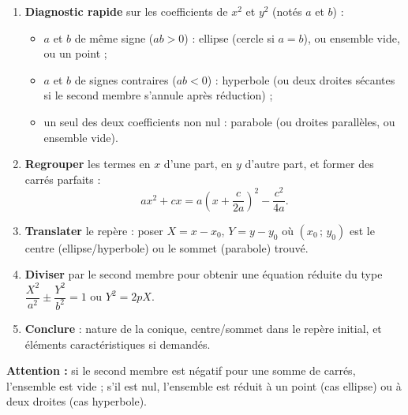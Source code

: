 \documentclass[11pt]{article}
\newcommand{\cle}[1]{{\popxbold\color{popdark}#1}}
\begin{document}
\begin{methode}
\begin{enumerate}
\item \textbf{Diagnostic rapide} sur les coefficients de $x^2$ et $y^2$ (notés $a$ et $b$) :
\begin{itemize}
\item $a$ et $b$ de même signe ($ab > 0$) : ellipse (cercle si $a = b$), ou ensemble vide, ou un point ;
\item $a$ et $b$ de signes contraires ($ab < 0$) : hyperbole (ou deux droites sécantes si le second membre s'annule après réduction) ;
\item un seul des deux coefficients non nul : parabole (ou droites parallèles, ou ensemble vide).
\end{itemize}
\item \textbf{Regrouper} les termes en $x$ d'une part, en $y$ d'autre part, et former des \cle{carrés parfaits} :
\[ ax^2 + cx = a\left(x + \frac{c}{2a}\right)^2 - \frac{c^2}{4a}. \]
\item \textbf{Translater} le repère : poser $X = x - x_0$, $Y = y - y_0$ où $(x_0\,;\,y_0)$ est le centre (ellipse/hyperbole) ou le sommet (parabole) trouvé.
\item \textbf{Diviser} par le second membre pour obtenir une équation réduite du type $\dfrac{X^2}{a^2} \pm \dfrac{Y^2}{b^2} = 1$ ou $Y^2 = 2pX$.
\item \textbf{Conclure} : nature de la conique, centre/sommet dans le repère initial, et éléments caractéristiques si demandés.
\end{enumerate}
\textbf{Attention :} si le second membre est négatif pour une somme de carrés, l'ensemble est vide ; s'il est nul, l'ensemble est réduit à un point (cas ellipse) ou à deux droites (cas hyperbole).
\end{methode}
\end{document}
